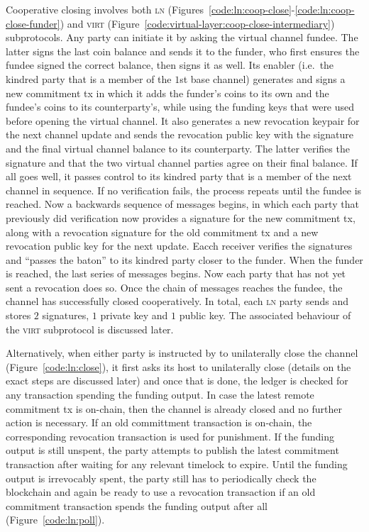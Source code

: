  Cooperative closing involves both \textsc{ln}
  (Figures~\ref{code:ln:coop-close}-\ref{code:ln:coop-close-funder}) and
  \textsc{virt} (Figure~\ref{code:virtual-layer:coop-close-intermediary})
  subprotocols. Any party can initiate it by asking the virtual channel fundee.
  The latter signs the last coin balance and sends it to the funder, who first
  ensures the fundee signed the correct balance, then signs it as well. Its
  enabler (i.e.\ the kindred party that is a member of the $1$st base channel)
  generates and signs a new commitment tx in which it adds the funder's coins to
  its own and the fundee's coins to its counterparty's, while using the funding
  keys that were used before opening the virtual channel. It also generates a
  new revocation keypair for the next channel update and sends the revocation
  public key with the signature and the final virtual channel balance to its
  counterparty. The latter verifies the signature and that the two virtual
  channel parties agree on their final balance. If all goes well, it passes
  control to its kindred party that is a member of the next channel in sequence.
  If no verification fails, the process repeats until the fundee is reached. Now
  a backwards sequence of messages begins, in which each party that previously
  did verification now provides a signature for the new commitment tx, along
  with a revocation signature for the old commitment tx and a new revocation
  public key for the next update. Eacch receiver verifies the signatures and
  ``passes the baton'' to its kindred party closer to the funder. When the
  funder is reached, the last series of messages begins. Now each party that has
  not yet sent a revocation does so. Once the chain of messages reaches the
  fundee, the channel has successfully closed cooperatively. In total, each
  \textsc{ln} party sends and stores $2$ signatures, $1$ private key and $1$
  public key. The associated behaviour of the \textsc{virt} subprotocol is
  discussed later.

  Alternatively, when either party is instructed by \environment to unilaterally close the
  channel (Figure~\ref{code:ln:close}), it first asks its host to unilaterally
  close (details on the exact steps are discussed later) and once that is done,
  the ledger is checked for any transaction spending the funding output. In case
  the latest remote commitment tx is on-chain, then the channel is already
  closed and no further action is necessary. If an old committment transaction
  is on-chain, the corresponding revocation transaction is used for punishment.
  If the funding output is still unspent, the party attempts to publish the
  latest commitment transaction after waiting for any relevant timelock to
  expire. Until the funding output is irrevocably spent, the party still has to
  periodically check the blockchain and again be ready to use a revocation
  transaction if an old commitment transaction spends the funding output after
  all (Figure~\ref{code:ln:poll}).

